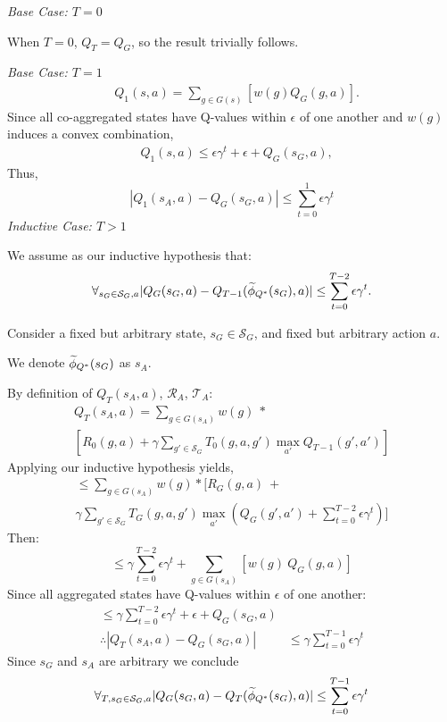 \textit{Base Case: $T = 0$}

When $T = 0$, $Q_T = Q_G$, so the result trivially follows.

\textit{Base Case: $T = 1$}
\begin{align*}
&Q_1(s,a) = \underset{g \in G(s)}{\sum} \left[ w(g)Q_G(g,a) \right].
\end{align*}
Since all co-aggregated states have Q-values within $\epsilon$ of one another and $w(g)$ induces a convex combination,
\begin{align*}
&Q_1(s,a) \leq \epsilon \gamma^t + \epsilon + Q_G(s_G, a),
\end{align*}
Thus,
\begin{equation}
\left| Q_{1}(s_A, a) - Q_G(s_G,a) \right| \leq \sum_{t=0}^{1}\epsilon \gamma^t
\end{equation}
\textit{Inductive Case: $T > 1$}

We assume as our inductive hypothesis that:
\begin{equation}
\forall_{s_G \in \mathcal{S}_G, a} |Q_G(s_G, a) - Q_{T-1}(\widetilde \phi_{Q^*}(s_G), a)| \leq \sum_{t=0}^{T-2} \epsilon \gamma^t.
\end{equation}

Consider a fixed but arbitrary state, $s_G \in \mathcal{S}_G$, and fixed but arbitrary action $a$.

We denote $\widetilde \phi_{Q^*}(s_G)$ as $s_A$. 

By definition of $Q_{T}(s_A, a)$, $\mathcal{R}_A$, $\mathcal{T}_A$:
\begin{multline*}
Q_T(s_A, a) = \sum_{g \in G(s_A)}w(g)\ * \\ 
 \left[ R_0(g,a) + \gamma \sum_{g' \in \mathcal{S}_G} T_0(g,a,g') \max_{a'} Q_{T-1}(g', a')      \right]
\end{multline*}
Applying our inductive hypothesis yields,
\begin{multline*}
\leq \sum_{g \in G(s_A)}w(g) * \biggl[ R_G(g,a)\ + \\ \gamma \sum_{g' \in \mathcal{S}_G} T_G(g,a,g') \max_{a'}(Q_G(g', a') + \sum_{t=0}^{T-2} \epsilon \gamma^t) \biggr]
\end{multline*}
Then:
\begin{equation*}
\leq \gamma\sum_{t=0}^{T-2} \epsilon \gamma^t + \sum_{g \in G(s_A)}\left[ w(g)\ Q_G(g,a)\right]
\end{equation*}
Since all aggregated states have Q-values within $\epsilon$ of one another:
\begin{align*}
\leq \gamma\sum_{t=0}^{T-2} \epsilon \gamma^t + \epsilon + Q_G(s_G, a) \\
\therefore \left| Q_{T}(s_A, a) - Q_G(s_G,a) \right| &\leq \gamma\sum_{t=0}^{T-1}\epsilon \gamma^t
\end{align*}
Since $s_G$ and $s_A$ are arbitrary we conclude
\begin{equation}
\forall_{T, s_G \in \mathcal{S}_G, a} |Q_G(s_G, a) - Q_T(\widetilde \phi_{Q^*}(s_G), a)| \leq \sum_{t=0}^{T-1} \epsilon \gamma^t
\end{equation}

